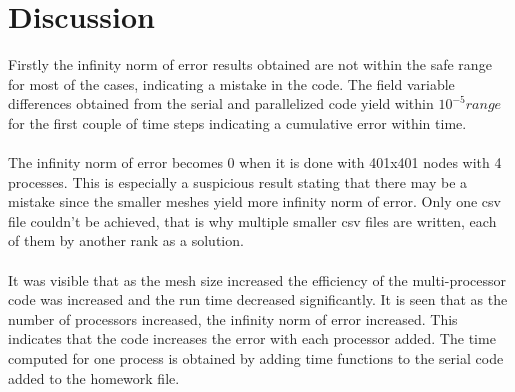 \documentclass{article}
\begin{document}
\section{Discussion}
Firstly the infinity norm of error results obtained are not within the safe range for most of the cases, indicating a mistake in the code. The field variable differences obtained from the serial and parallelized code yield within $10^{-5} range$ for the first couple of time steps indicating a cumulative error within time. \\
\\The infinity norm of error becomes 0 when it is done with 401x401 nodes with 4 processes. This is especially a suspicious result stating that there may be a mistake since the smaller meshes yield more infinity norm of error. Only one csv file couldn't be achieved, that is why multiple smaller csv files are written, each of them by another rank as a solution.\\
\\It was visible that as the mesh size increased the efficiency of the multi-processor code was increased and the run time decreased significantly. It is seen that as the number of processors increased, the infinity norm of error increased. This indicates that the code increases the error with each processor added.
The time computed for one process is obtained by adding time functions to the serial code added to the homework file.
\end{document}

